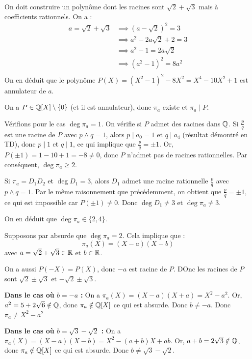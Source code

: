 \documentclass[11pt,a4paper]{report}
\begin{document}
\begin{correction}
    On doit construire un polynôme dont les racines sont $\sqrt 2 + \sqrt 3$ mais à coefficients rationnels. On a :
    \begin{align*}
        a = \sqrt2+\sqrt3 &\implies (a-\sqrt2)^2 = 3 \\
        &\implies a^2 - 2a\sqrt2 + 2 = 3 \\
        &\implies a^2 - 1 = 2a\sqrt2 \\
        &\implies (a^2 - 1)^2 = 8a^2 \\
    \end{align*}
    On en déduit que le polynôme $P(X) = (X^2 - 1)^2 - 8X^2 = X^4 - 10X^2 + 1$ est annulateur de $a$.

    On a $P \in \mathbb{Q}[X] \setminus \{0\}$ (et il est annulateur), donc $\pi_a$ existe et $\pi_a \mid P$.

    Vérifions pour le cas $\deg \pi_a = 1$. On vérifie si $P$ admet des racines dans $\mathbb{Q}$. Si $\frac pq$ est une racine de $P$ avec $p\wedge q = 1$, alors $p\mid a_0 = 1$ et $q \mid a_4$ (résultat démontré en TD), donc $p \mid 1$ et $q \mid 1$, ce qui implique que $\frac pq = \pm 1$. Or, $P(\pm 1) = 1 - 10 + 1 = -8 \ne 0$, donc $P$ n'admet pas de racines rationnelles. Par conséquent, $\deg \pi_a \ge 2$.

    Si $\pi_a = D_1D_2$ et $\deg D_1 = 3$, alors $D_1$ admet une racine rationnelle $\frac pq$ avec $p\wedge q = 1$. Par le même raisonnement que précédemment, on obtient que $\frac pq = \pm 1$, ce qui est impossible car $P(\pm 1) \ne 0$. Donc $\deg D_1 \ne 3$ et $\deg \pi_a \ne 3$.

    On en déduit que $\deg \pi_a \in \{2,4\}$.

    Supposons par absurde que $\deg \pi_a = 2$. Cela implique que :
    $$\pi_a(X) = (X-a)(X-b)$$
    avec $a = \sqrt 2 + \sqrt 3 \in \mathbb{R}$ et $b \in \mathbb{R}$.

    On a aussi $P(-X) = P(X)$, donc $-a$ est racine de $P$. DOnc les racines de $P$ sont $\sqrt 2 \pm \sqrt 3$ et $-\sqrt 2 \pm \sqrt 3$.    

    \textbf{Dans le cas où $b=-a$ :}
    On a $\pi_a(X) = (X-a)(X+a) = X^2 - a^2$. Or, $a^2 = 5 + 2\sqrt 6 \notin \mathbb{Q}$, donc $\pi_a \notin \mathbb{Q}[X]$ ce qui est absurde. Donc $b \ne -a$. Donc $\pi_a \ne X^2 - a^2$

    \textbf{Dans le cas où $b = \sqrt 3 - \sqrt 2$ :}
    On a $\pi_a(X) = (X-a)(X-b) = X^2 - (a+b)X + ab$. Or, $a+b = 2\sqrt 3 \notin \mathbb{Q}$, donc $\pi_a \notin \mathbb{Q}[X]$ ce qui est absurde. Donc $b \ne \sqrt 3 - \sqrt 2$.


\end{correction}
\end{document}
